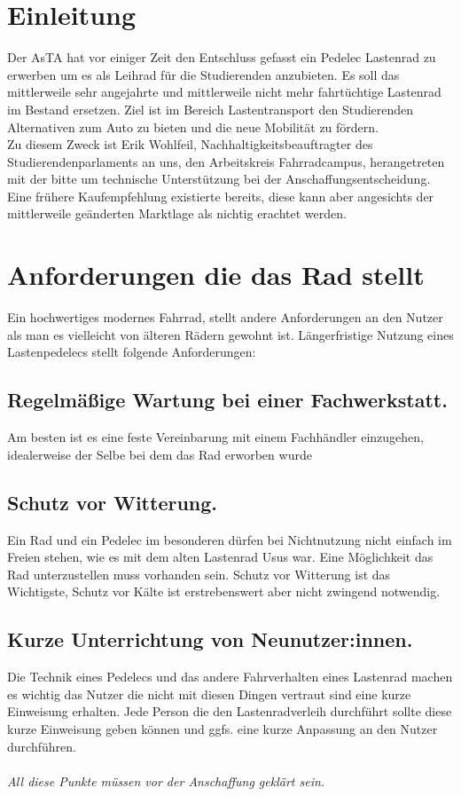 \documentclass[a4paper,ngerman, 14pt] {scrartcl}
\begin{document}
\tableofcontents
\newpage
\section{Einleitung}
Der AsTA hat vor einiger Zeit den Entschluss gefasst ein Pedelec Lastenrad zu erwerben um es als Leihrad für die Studierenden anzubieten. Es soll das mittlerweile sehr angejahrte und mittlerweile nicht mehr fahrtüchtige Lastenrad im Bestand ersetzen. Ziel ist im Bereich Lastentransport den Studierenden Alternativen zum Auto zu bieten und die neue Mobilität zu fördern.\\
Zu diesem Zweck ist Erik Wohlfeil, Nachhaltigkeitsbeauftragter des Studierendenparlaments an uns, den Arbeitskreis Fahrradcampus, herangetreten mit der bitte um technische Unterstützung bei der Anschaffungsentscheidung. Eine frühere Kaufempfehlung existierte bereits, diese kann aber angesichts der mittlerweile geänderten Marktlage als nichtig erachtet werden.\\


\section{Anforderungen die das Rad stellt}
Ein hochwertiges modernes Fahrrad, stellt andere Anforderungen an den Nutzer als man es vielleicht von älteren Rädern gewohnt ist. Längerfristige Nutzung eines Lastenpedelecs stellt folgende Anforderungen:\\

\subsection{Regelmäßige Wartung bei einer Fachwerkstatt.} Am besten ist es eine feste Vereinbarung mit einem Fachhändler einzugehen, idealerweise der Selbe bei dem das Rad erworben wurde

\subsection{Schutz vor Witterung.} Ein Rad und ein Pedelec im besonderen dürfen bei Nichtnutzung nicht einfach im Freien stehen, wie es mit dem alten Lastenrad Usus war. Eine Möglichkeit das Rad unterzustellen muss vorhanden sein. Schutz vor Witterung ist das Wichtigste, Schutz vor Kälte ist erstrebenswert aber nicht zwingend notwendig.

\subsection{Kurze Unterrichtung von Neunutzer:innen.} Die Technik eines Pedelecs und das andere Fahrverhalten eines Lastenrad machen es wichtig das Nutzer die nicht mit diesen Dingen vertraut sind eine kurze Einweisung erhalten. Jede Person die den Lastenradverleih durchführt sollte diese kurze Einweisung geben können und ggfs. eine kurze Anpassung an den Nutzer durchführen.\\
\vspace{2mm}\\
\textit{All diese Punkte müssen vor der Anschaffung geklärt sein.}
\end{document}
